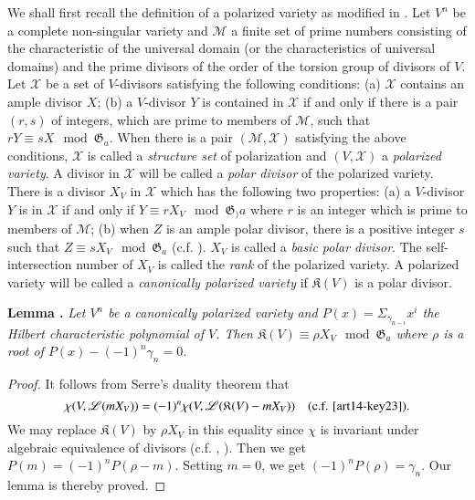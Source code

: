 We shall first recall the definition of a polarized variety as modified in \cite{art14-key16}. Let $V^{n}$ be a complete non-singular variety and $\mathscr{M}$ a finite set of prime numbers consisting of the characteristic of the universal domain (or the characteristics of universal domains) and the prime divisors of the order of the torsion group of divisors of $V$. Let $\mathscr{X}$ be a set of $V$-divisors satisfying the following conditions: (a) $\mathscr{X}$ contains an ample divisor $X$; (b) a $V$-divisor $Y$ is contained in $\mathscr{X}$ if and only if there is a pair $(r,s)$ of integers, which are prime to members of $\mathscr{M}$, such that $rY\equiv sX\mod \mathfrak{G}_{a}$. When there is a pair $(\mathscr{M},\mathscr{X})$ satisfying the above conditions, $\mathscr{X}$ is called a {\em structure set} of polarization and $(V,\mathscr{X})$ a {\em polarized variety}. A divisor in $\mathscr{X}$ will be called a {\em polar divisor} of the polarized variety. There is a divisor $X_{V}$ in $\mathscr{X}$ which has the following two properties: (a) a $V$-divisor $Y$ is in $\mathscr{X}$ if and only if $Y\equiv rX_{V}\mod \mathfrak{G}_){a}$ where $r$ is an integer which is prime to members of $\mathscr{M}$; (b) when $Z$ is an ample polar divisor, there is a positive integer $s$ such that $Z\equiv sX_{V}\mod \mathfrak{G}_{a}$ (c.f. \cite{art14-key16}). $X_{V}$ is called a {\em basic polar divisor}. The self-intersection number of $X_{V}$ is called the {\em rank} of the polarized variety. A polarized variety will be called a {\em canonically polarized variety} if $\mathfrak{K}(V)$ is a polar divisor.

\eject

\noindent
{\bf Lemma .\label{art14-lem1}}
{\em Let $V^{n}$ be a canonically polarized variety and $P(x)=\Sigma_{\gamma_{n-i}}x^{i}$ the Hilbert characteristic polynomial of $V$. Then $\mathfrak{K}(V)\equiv \rho X_{V}\mod \mathfrak{G}_{a}$ where $\rho$ is a root of $P(x)-(-1)^{n}\gamma_{n}=0$.}

\begin{proof}
It follows from Serre's duality theorem that 
$$
\chi(V,\mathscr{L}(mX_{V}))=(-1)^{n}\chi(V,\mathscr{L}(\mathfrak{K}(V)-mX_{V}))\quad (\text{c.f. \cite{art14-key23}}).
$$\pageoriginale
We may replace $\mathfrak{K}(V)$ by $\rho X_{V}$ in this equality since $\chi$ is invariant under algebraic equivalence of divisors (c.f. \cite{art14-key4}, \cite{art14-key16}). Then we get $P(m)=(-1)^{n}P(\rho-m)$. Setting $m=0$, we get $(-1)^{n}P(\rho)=\gamma_{n}$. Our lemma is thereby proved.
\end{proof}

